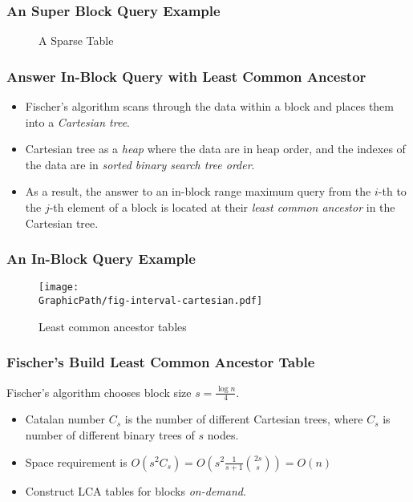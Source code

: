 \begin{frame}
    \frametitle{An Super Block Query Example}
	\begin{figure}[!thb]
		\centering {} 
	  	\caption{A Sparse Table}
	  	\label{fig:block-interval-decomposition}
	\end{figure}
\end{frame}

\begin{frame}
	\frametitle{Answer In-Block Query with Least Common Ancestor}
	\begin{itemize}
		\setlength\itemsep{1em}
		\item
			Fischer's algorithm scans through the data within a block
			and places them into a {\em Cartesian tree}.
		\item
			Cartesian tree as a {\em heap} where the data are in heap
			order, and the indexes of the data are in {\em sorted binary
			search tree order}.
		\item 
			As a result, the answer to an in-block range maximum query
			from the $i$-th to the $j$-th element of a block is located
			at their {\em least common ancestor} in the Cartesian tree.
	\end{itemize}
\end{frame}

\begin{frame}
	\frametitle{An In-Block Query Example}
	\begin{figure}[htbp]   
	  \centering
	  \texttt{[image: \\GraphicPath/fig-interval-cartesian.pdf]}
	  \caption{Least common ancestor tables}
	  \label{fig:ancesstor-cartesian}
	\end{figure}
\end{frame}

\begin{frame}
	\frametitle{Fischer's Build Least Common Ancestor Table}
	Fischer's algorithm chooses block size $s=\frac{\log n}{4}$.
	\begin{itemize}
		\setlength\itemsep{1em}
		\item 
			Catalan number $C_s$ is the number of different Cartesian
			trees, where $C_s$ is number of different binary trees of
			$s$ nodes.
		\item
			Space requirement is
			$O(s^2C_s)=O(s^2\frac{1}{s+1}\binom{2s}{s})=O(n)$
		\item
			Construct LCA tables for blocks {\em on-demand}.
	\end{itemize}
\end{frame}


